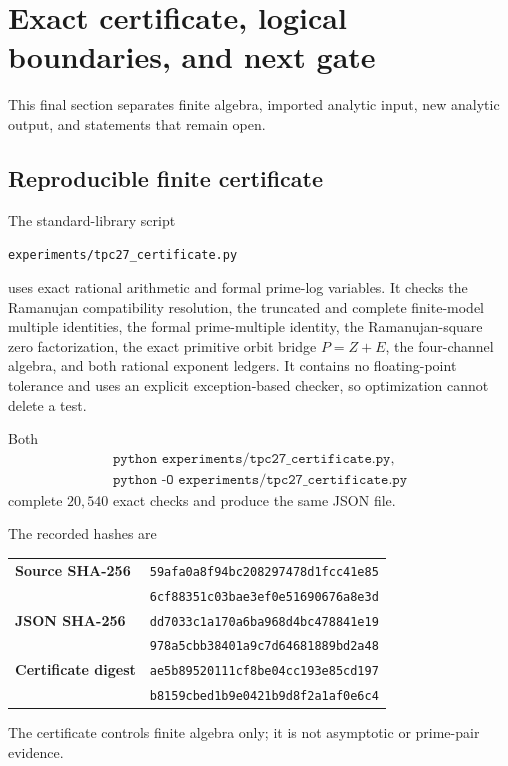 \section{Exact certificate, logical boundaries, and next gate}
\label{sec:tpc27-certificate-scope}

This final section separates finite algebra, imported analytic input,
new analytic output, and statements that remain open.

\subsection{Reproducible finite certificate}

The standard-library script
\begin{center}
 \texttt{experiments/tpc27\_certificate.py}
\end{center}
uses exact rational arithmetic and formal prime-log variables.  It
checks the Ramanujan compatibility resolution, the truncated and
complete finite-model multiple identities, the formal prime-multiple
identity, the Ramanujan-square zero factorization, the exact primitive
orbit bridge \(P=Z+E\), the four-channel algebra, and both rational exponent
ledgers.  It contains no floating-point tolerance and uses an explicit
exception-based checker, so optimization cannot delete a test.

Both
\[
 \begin{gathered}
 \texttt{python experiments/tpc27\_certificate.py},\\
 \texttt{python -O experiments/tpc27\_certificate.py}
 \end{gathered}
\]
complete \(20{,}540\) exact checks and produce the same JSON file.
\begin{samepage}
The recorded hashes are
\begin{center}
\footnotesize
\begin{tabular}{@{}>{\bfseries}l l@{}}
Source SHA-256 & \texttt{59afa0a8f94bc208297478d1fcc41e85}\\[-0.15em]
& \texttt{6cf88351c03bae3ef0e51690676a8e3d}\\
JSON SHA-256 & \texttt{dd7033c1a170a6ba968d4bc478841e19}\\[-0.15em]
& \texttt{978a5cbb38401a9c7d64681889bd2a48}\\
Certificate digest & \texttt{ae5b89520111cf8be04cc193e85cd197}\\[-0.15em]
& \texttt{b8159cbed1b9e0421b9d8f2a1af0e6c4}
\end{tabular}
\end{center}
\end{samepage}
The certificate controls finite algebra only; it is not asymptotic or
prime-pair evidence.

